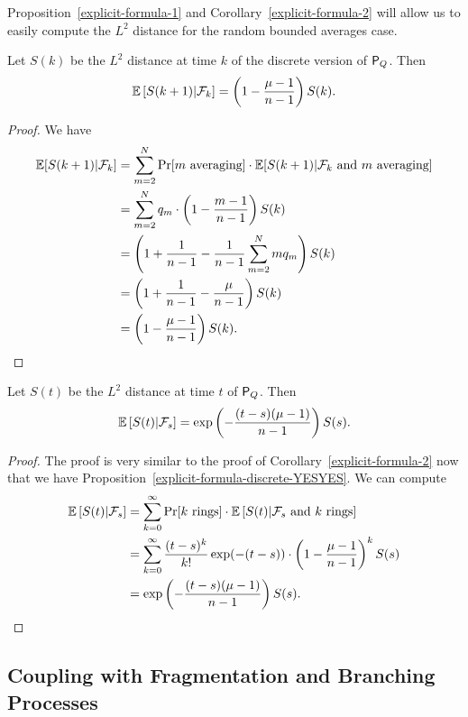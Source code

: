 \documentclass[12pt]{article}
\begin{document}
Proposition~\ref{explicit-formula-1} and Corollary~\ref{explicit-formula-2} will allow us to easily compute the $L^2$ distance for the random bounded averages case. 

\begin{prop} \label{explicit-formula-discrete-YESYES}
	Let $S(k)$ be the $L^2$ distance at time $k$ of the discrete version of $\mathsf{P}_Q$. Then 
	\[
		\mathbb{E} \left [ S(k+1) | \mathcal{F}_k \right ] = \left ( 1 - \frac{\mu - 1}{n-1} \right ) S(k). 
	\]
\end{prop}
\begin{proof}
	We have 
	\begin{align*}
		\mathbb{E}[S(k+1) | \mathcal{F}_k] & = \sum_{m = 2}^N \Pr[m \text{ averaging}] \cdot \mathbb{E}[S(k+1) | \mathcal{F}_k \text{ and } m \text{ averaging}] \\
		& = \sum_{m = 2}^N q_m \cdot \left ( 1 - \frac{m -1}{n-1} \right ) S(k) \\
		& = \left ( 1 + \frac{1}{n-1} - \frac{1}{n-1} \sum_{m = 2}^N mq_m \right ) S(k) \\
		& = \left ( 1 + \frac{1}{n-1} - \frac{\mu}{n-1} \right ) S(k) \\
		& = \left ( 1 - \frac{\mu - 1}{n-1} \right ) S(k). 
	\end{align*}
\end{proof}

\begin{cor} \label{explicit-formula-continuous-YESYES}
	Let $S(t)$ be the $L^2$ distance at time $t$ of $\mathsf{P}_Q$. Then 
	\[
		\mathbb{E} \left [ S(t) | \mathcal{F}_s \right ] = \exp \left ( - \frac{(t-s)(\mu - 1)}{n-1} \right ) S(s).
	\]
\end{cor}

\begin{proof}
	The proof is very similar to the proof of Corollary~\ref{explicit-formula-2} now that we have Proposition~\ref{explicit-formula-discrete-YESYES}. We can compute 
	\begin{align*}
		\mathbb{E} \left [S(t) | \mathcal{F}_s \right ] & = \sum_{k = 0}^\infty \Pr[k \text{ rings}] \cdot \mathbb{E} \left [ S(t) | \mathcal{F}_s \text{ and } k \text{ rings} \right ] \\
		& = \sum_{k = 0}^\infty \frac{(t-s)^k}{k!} \exp (-(t-s)) \cdot \left ( 1 - \frac{\mu - 1}{n-1} \right )^k S(s) \\
		& = \exp \left ( - \frac{(t-s) (\mu - 1)}{n-1} \right ) S(s). 
	\end{align*}
\end{proof}

\subsection{Coupling with Fragmentation and Branching Processes}
\end{document}
